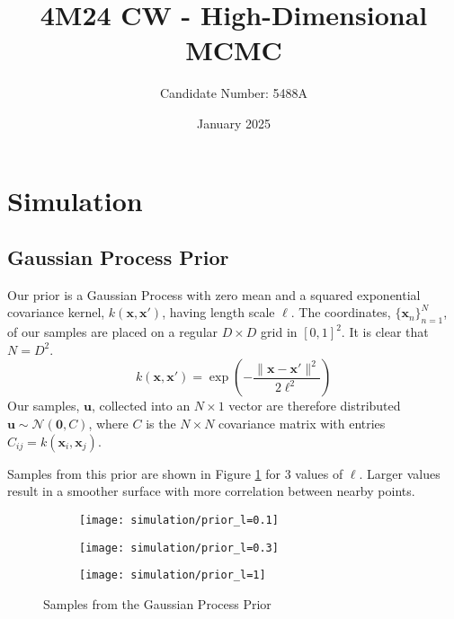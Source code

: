 \documentclass[11pt]{article}
\title{4M24 CW - High-Dimensional MCMC}
\author{Candidate Number: 5488A}
\date{January 2025}
\begin{document}

\setcounter{page}{1}

\maketitle

\section{Simulation}
\subsection{Gaussian Process Prior}
Our prior is a Gaussian Process with zero mean and a squared exponential covariance kernel, $k(\boldsymbol{x}, \boldsymbol{x}')$, having length scale $\ell$. The coordinates, $\{\boldsymbol{x}_n\}_{n=1}^{N}$, of our samples are placed on a regular $D \times D$ grid in $[0, 1]^2$. It is clear that $N = D^2$.
\begin{equation}
    k(\boldsymbol{x}, \boldsymbol{x}') = \exp\left(-\frac{\|\boldsymbol{x} - \boldsymbol{x}'\|^2}{2\ell^2}\right)
\end{equation}
Our samples, $\boldsymbol{u}$, collected into an $N \times 1$ vector are therefore distributed $\boldsymbol{u} \sim \mathcal{N}(\boldsymbol{0}, C)$, where $C$ is the $N \times N$ covariance matrix with entries $C_{ij} = k(\boldsymbol{x}_i, \boldsymbol{x}_j)$.

Samples from this prior are shown in Figure \ref{fig:gp_prior} for 3 values of $\ell$. Larger values result in a smoother surface with more correlation between nearby points.

\begin{figure}
    \centering
    \begin{subfigure}{0.3\textwidth}
        \texttt{[image: simulation/prior\_l=0.1]}
    \end{subfigure}
    \begin{subfigure}{0.3\textwidth}
        \texttt{[image: simulation/prior\_l=0.3]}
    \end{subfigure}
    \begin{subfigure}{0.3\textwidth}
        \texttt{[image: simulation/prior\_l=1]}
    \end{subfigure}
    \caption{Samples from the Gaussian Process Prior}
    \label{fig:gp_prior}
\end{figure}
\end{document}
